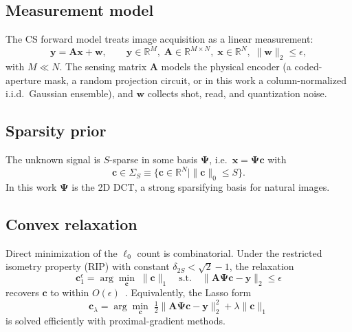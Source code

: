 \documentclass{article}
\begin{document}
\subsection{Measurement model}

The CS forward model treats image acquisition as a linear measurement:
\begin{equation}
  \boldsymbol{y} = \boldsymbol{A}\boldsymbol{x} + \boldsymbol{w},
  \qquad
  \boldsymbol{y} \in \mathbb{R}^M,\;
  \boldsymbol{A} \in \mathbb{R}^{M \times N},\;
  \boldsymbol{x} \in \mathbb{R}^N,\;
  \|\boldsymbol{w}\|_2 \le \epsilon,
  \label{eq:forward}
\end{equation}
with $M \ll N$. The sensing matrix $\boldsymbol{A}$ models the physical encoder (a coded-aperture mask, a random projection circuit, or in this work a column-normalized i.i.d.\ Gaussian ensemble), and $\boldsymbol{w}$ collects shot, read, and quantization noise.

\subsection{Sparsity prior}

The unknown signal is $S$-sparse in some basis $\boldsymbol{\Psi}$, i.e.\ $\boldsymbol{x} = \boldsymbol{\Psi}\boldsymbol{c}$ with
\begin{equation}
  \boldsymbol{c} \in \Sigma_S \equiv \{\boldsymbol{c} \in \mathbb{R}^N \mid \|\boldsymbol{c}\|_0 \le S\}.
\end{equation}
In this work $\boldsymbol{\Psi}$ is the 2D DCT, a strong sparsifying basis for natural images.

\subsection{Convex relaxation}

Direct minimization of the $\ell_0$ count is combinatorial. Under the restricted isometry property (RIP) with constant $\delta_{2S} < \sqrt{2}-1$, the relaxation
\begin{equation}
  \boldsymbol{c}_1^{\epsilon}
  = \arg\min_{\boldsymbol{c}}\;
    \|\boldsymbol{c}\|_1
    \quad \text{s.t.} \quad
    \|\boldsymbol{A}\boldsymbol{\Psi}\boldsymbol{c} - \boldsymbol{y}\|_2 \le \epsilon
  \label{eq:bp-denoise}
\end{equation}
recovers $\boldsymbol{c}$ to within $O(\epsilon)$~\citep{candes2006stable}. Equivalently, the Lasso form
\begin{equation}
  \boldsymbol{c}_\lambda
  = \arg\min_{\boldsymbol{c}}\;
    \tfrac{1}{2}\|\boldsymbol{A}\boldsymbol{\Psi}\boldsymbol{c} - \boldsymbol{y}\|_2^2
    + \lambda \|\boldsymbol{c}\|_1
  \label{eq:lasso}
\end{equation}
is solved efficiently with proximal-gradient methods.
\end{document}
